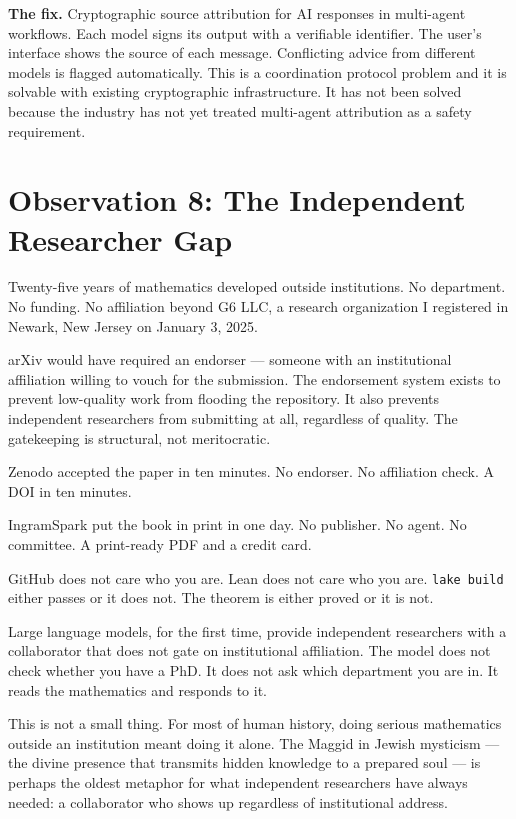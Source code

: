 \textbf{The fix.} Cryptographic source attribution for AI
responses in multi-agent workflows. Each model signs its output
with a verifiable identifier. The user's interface shows the
source of each message. Conflicting advice from different models
is flagged automatically. This is a coordination protocol
problem and it is solvable with existing cryptographic
infrastructure. It has not been solved because the industry
has not yet treated multi-agent attribution as a safety
requirement.

\section{Observation 8: The Independent Researcher Gap}
\label{sec:independent}

Twenty-five years of mathematics developed outside institutions.
No department. No funding. No affiliation beyond G6 LLC, a
research organization I registered in Newark, New Jersey on
January 3, 2025.

arXiv would have required an endorser --- someone with an
institutional affiliation willing to vouch for the submission.
The endorsement system exists to prevent low-quality work from
flooding the repository. It also prevents independent researchers
from submitting at all, regardless of quality. The gatekeeping
is structural, not meritocratic.

Zenodo accepted the paper in ten minutes. No endorser. No
affiliation check. A DOI in ten minutes.

IngramSpark put the book in print in one day. No publisher.
No agent. No committee. A print-ready PDF and a credit card.

GitHub does not care who you are. Lean does not care who you are.
\texttt{lake build} either passes or it does not. The theorem
is either proved or it is not.

Large language models, for the first time, provide independent
researchers with a collaborator that does not gate on
institutional affiliation. The model does not check whether
you have a PhD. It does not ask which department you are in.
It reads the mathematics and responds to it.

This is not a small thing. For most of human history, doing
serious mathematics outside an institution meant doing it alone.
The Maggid in Jewish mysticism --- the divine presence that
transmits hidden knowledge to a prepared soul --- is perhaps
the oldest metaphor for what independent researchers have always
needed: a collaborator who shows up regardless of institutional
address.

